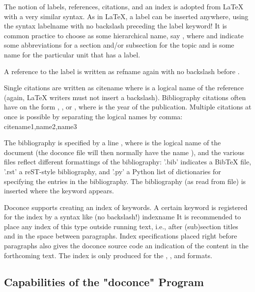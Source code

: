 \documentclass{book}
\begin{document}
{The notion of labels, references, citations, and an index is adopted
from {\LaTeX} with a very similar syntax. As in {\LaTeX}, a label can be
inserted anywhere, using the syntax
\bccq
label{name}
\eccq
with no backslash
preceding the label keyword! It is common practice to choose 
as some hierarchical name, say , where  and  indicate
some abbreviations for a section and/or subsection for the topic and
 is some name for the particular unit that has a label.

A reference to the label  is written as
\bccq
ref{name}
\eccq
again with no backslash before .

Single citations are written as
\bccq
cite{name}
\eccq
where  is a logical name
of the reference (again, {\LaTeX} writers must not insert a backslash).
Bibliography citations often have  on the form
, , or , where
 is the year of the publication.
Multiple citations at once is possible by separating the logical names
by comma:
\bccq
cite{name1,name2,name3}
\eccq

The bibliography is specified by a line , where  is the logical name of the
document (the doconce file will then normally have the name
), and the various files reflect different formattings of
the bibliography: '.bib' indicates a BibTeX file, '.rst' a reST-style
bibliography, and '.py' a Python list of dictionaries for specifying
the entries in the bibliography. The bibliography (as read from file)
is inserted where the  keyword appears.

Doconce supports creating an index of keywords. A certain keyword
is registered for the index by a syntax like (no
backslash!)
\bccq
index{name}
\eccq
It is recommended to place any index of this type outside
running text, i.e., after (sub)section titles and in the space between
paragraphs. Index specifications placed right before paragraphs also
gives the doconce source code an indication of the content in the
forthcoming text. The index is only produced for the , , and
 formats.

\subsection{Capabilities of the "doconce" Program}

}
\end{document}
